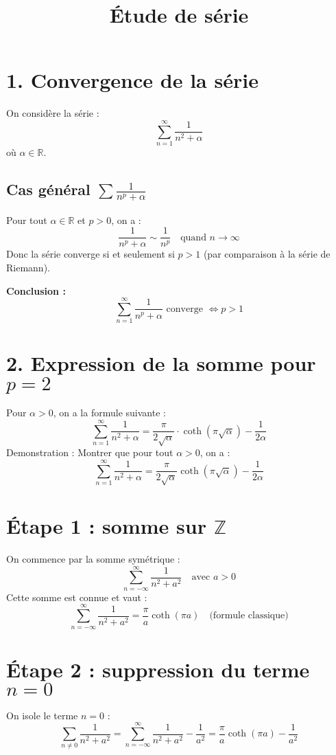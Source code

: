 \documentclass[a4paper,11pt]{article}
\title{Étude de série}
\author{}
\date{}
\begin{document}
\maketitle

\section*{1. Convergence de la série}

On considère la série :
\[
\sum_{n=1}^{\infty} \frac{1}{n^2 + \alpha}
\]
où \( \alpha \in \mathbb{R} \). 

\subsection*{Cas général \(\displaystyle \sum \frac{1}{n^p + \alpha}\)}

Pour tout \( \alpha \in \mathbb{R} \) et \( p > 0 \), on a :
\[
\frac{1}{n^p + \alpha} \sim \frac{1}{n^p} \quad \text{quand } n \to \infty
\]
Donc la série converge si et seulement si \( p > 1 \) (par comparaison à la série de Riemann).

\medskip
\textbf{Conclusion :}
\[
\sum_{n=1}^{\infty} \frac{1}{n^p + \alpha} \text{ converge } \iff p > 1
\]

\section*{2. Expression de la somme pour \( p = 2 \)}

Pour \( \alpha > 0 \), on a la formule suivante :
\[
\sum_{n=1}^{\infty} \frac{1}{n^2 + \alpha}
= \frac{\pi}{2\sqrt{\alpha}} \cdot \coth(\pi \sqrt{\alpha}) - \frac{1}{2\alpha}
\]
Demonstration :
Montrer que pour tout \( \alpha > 0 \), on a :
\[
\sum_{n=1}^{\infty} \frac{1}{n^2 + \alpha}
= \frac{\pi}{2\sqrt{\alpha}} \coth(\pi \sqrt{\alpha}) - \frac{1}{2\alpha}
\]

\section*{Étape 1 : somme sur \( \mathbb{Z} \)}
On commence par la somme symétrique :
\[
\sum_{n=-\infty}^{\infty} \frac{1}{n^2 + a^2}
\quad \text{avec } a > 0
\]
Cette somme est connue et vaut :
\[
\sum_{n=-\infty}^{\infty} \frac{1}{n^2 + a^2}
= \frac{\pi}{a} \coth(\pi a)
\quad \text{(formule classique)}
\]

\section*{Étape 2 : suppression du terme \( n = 0 \)}
On isole le terme \( n = 0 \) :
\[
\sum_{n\neq 0} \frac{1}{n^2 + a^2}
= \sum_{n=-\infty}^{\infty} \frac{1}{n^2 + a^2} - \frac{1}{a^2}
= \frac{\pi}{a} \coth(\pi a) - \frac{1}{a^2}
\]
\end{document}
